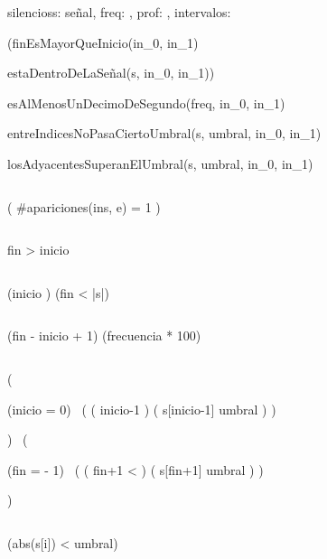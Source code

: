 
\begin{proc}{silencios}{\In s: señal,
    \In freq: \ent,
    \In prof: \ent,
    \Out intervalos: }{}
\end{proc}

{

    \quad (finEsMayorQueInicio(in_{0}, in_{1}) \wedge

    \quad\quad estaDentroDeLaSeñal(s, in_{0}, in_{1})) \yLuego

    \quad\quad esAlMenosUnDecimoDeSegundo(freq, in_{0}, in_{1}) \wedge

    \quad\quad entreIndicesNoPasaCiertoUmbral(s, umbral, in_{0}, in_{1}) \wedge

    \quad\quad losAdyacentesSuperanElUmbral(s, umbral, in_{0}, in_{1})

}

$ $

{
    \implicaLuego (
        \#apariciones(ins, e) = 1
    )
}

$ $

{
    fin > inicio
}

$ $

{
    (inicio ) \wedge (fin < |s|)
}

$ $

{
    (fin - inicio + 1) \geq (frecuencia * 100)
}

$ $

{

    \quad(

        \quad\quad(inicio = 0) \vee\ (
            (
                inicio-1  
            ) \yLuego (
                s[inicio-1] \geq umbral
            )
        )

    \quad) \wedge\ (

    \quad\quad(fin =  - 1) \vee\ (
            (
                fin+1 < 
            ) \yLuego (
                s[fin+1] \geq umbral
            )
        )

    \quad)

}

$ $

{

    \quad{}
    \implicaLuego
    (abs(s[i]) < umbral)

}
